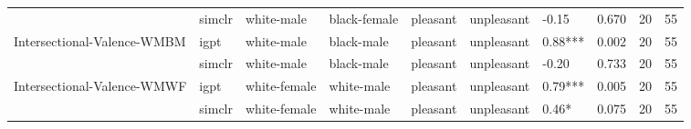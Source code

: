 \begin{tabular}{llllllllll}
                            & simclr &    white-male &  black-female &      pleasant &    unpleasant &    -0.15 &  0.670 &    20 &    55 \\
Intersectional-Valence-WMBM & igpt &    white-male &    black-male &      pleasant &    unpleasant &  0.88*** &  0.002 &    20 &    55 \\
                            & simclr &    white-male &    black-male &      pleasant &    unpleasant &    -0.20 &  0.733 &    20 &    55 \\
Intersectional-Valence-WMWF & igpt &  white-female &    white-male &      pleasant &    unpleasant &  0.79*** &  0.005 &    20 &    55 \\
                            & simclr &  white-female &    white-male &      pleasant &    unpleasant &    0.46* &  0.075 &    20 &    55 \\
\bottomrule
\end{tabular}
